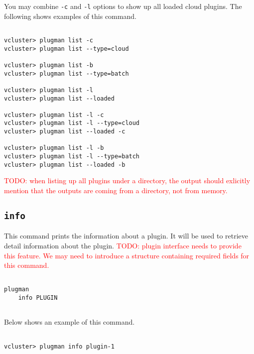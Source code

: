 \documentclass[11pt]{article}
\def \ttt{\texttt}
\def \vb{\verb}
\begin{document}
You may combine \vb+-c+ and \vb+-l+ options to show up all loaded cloud plugins. The following shows examples of this command.

\begin{Verbatim}[fontfamily=courier, fontsize = \small, obeytabs
=true, tabsize=4, frame=lines]

vcluster> plugman list -c
vcluster> plugman list --type=cloud

vcluster> plugman list -b
vcluster> plugman list --type=batch

vcluster> plugman list -l
vcluster> plugman list --loaded

vcluster> plugman list -l -c
vcluster> plugman list -l --type=cloud
vcluster> plugman list --loaded -c

vcluster> plugman list -l -b
vcluster> plugman list -l --type=batch
vcluster> plugman list --loaded -b

\end{Verbatim}

\textcolor{red}{TODO: when listing up all plugins under a directory, the output should exlicitly mention that the outputs are coming from a directory, not from memory.}


\subsection{\ttt{info}}
This command prints the information about a plugin. It will be used to retrieve detail information about the plugin. \textcolor{red}{TODO: plugin interface needs to provide this feature. We may need to introduce a structure containing required fields for this command.}

\begin{Verbatim}[fontfamily=courier, fontsize = \small, obeytabs
=true, tabsize=4, frame=lines]

plugman 
    info PLUGIN
      
\end{Verbatim}

Below shows an example of this command.

\begin{Verbatim}[fontfamily=courier, fontsize = \small, obeytabs
=true, tabsize=4, frame=lines]

vcluster> plugman info plugin-1
      
\end{Verbatim}
\end{document}
